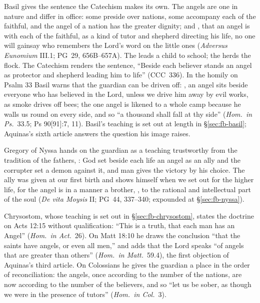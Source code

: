 Basil gives the sentence the Catechism makes its own. The angels are one in
nature and differ in office: some preside over nations, some accompany each
of the faithful, and the angel of a nation has the greater dignity; and
, that an angel
is with each of the faithful, as a kind of tutor and shepherd directing his
life, no one will gainsay who remembers the Lord's word on the little ones
(\emph{Adversus Eunomium} III.1; PG~29, 656B--657A). The 
leads a child to school; the  herds the flock. The Catechism
renders the sentence, ``Beside each believer stands an angel as protector and
shepherd leading him to life'' (CCC~336). In the homily on Psalm 33 Basil
warns that the guardian can be driven off: , an angel sits beside everyone who has believed in
the Lord, unless we drive him away by evil works, as smoke drives off bees;
the one angel is likened to a whole camp because he walls us round on every
side, and so ``a thousand shall fall at thy side'' (\emph{Hom.\ in Ps.}\ 33.5;
Ps 90[91]:7, 11). Basil's teaching is set out at length in
\S\ref{sec:fb-basil}; Aquinas's sixth article answers the question his image
raises.

Gregory of Nyssa hands on the guardian as a teaching trustworthy from the
tradition of the fathers, : God set beside
each life an angel as an ally and the corrupter set a demon against it, and
man gives the victory by his choice. The ally was given at our first birth
and shows himself when we set out for the higher life, for the angel is in
a manner a brother, , to the rational and intellectual part of
the soul (\emph{De vita Moysis} II; PG~44, 337--340; expounded at
\S\ref{sec:fb-nyssa}).

Chrysostom, whose teaching is set out in \S\ref{sec:fb-chrysostom}, states
the doctrine on Acts 12:15 without qualification: ``This is a truth, that
each man has an Angel'' (\emph{Hom.\ in Act.}\ 26). On Matt 18:10 he draws
the conclusion ``that the saints have angels, or even all men,'' and adds that
the Lord speaks ``of angels that are greater than others'' (\emph{Hom.\ in
Matt.}\ 59.4), the first objection of Aquinas's third article. On Colossians
he gives the guardian a place in the order of reconciliation: the angels,
once according to the number of the nations, are now according to the
number of the believers, and so ``let us be sober, as though we were in the
presence of tutors'' (\emph{Hom.\ in Col.}\ 3).

